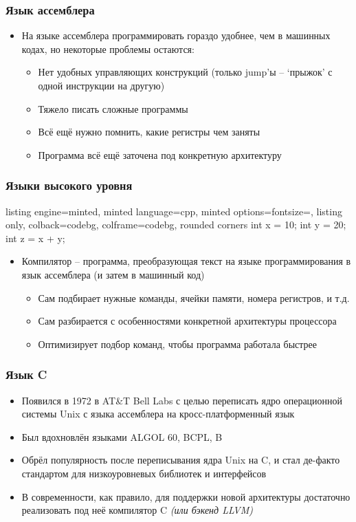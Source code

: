 \documentclass[10pt]{beamer}
\begin{document}
\begin{frame}[fragile]
\frametitle{Язык ассемблера}
\begin{itemize}
\item На языке ассемблера программировать гораздо удобнее, чем в машинных кодах, но некоторые проблемы остаются:
\pause
\begin{itemize}
\item Нет удобных управляющих конструкций (только jump'ы -- `прыжок' с одной инструкции на другую)
\pause
\item Тяжело писать сложные программы
\pause
\item Всё ещё нужно помнить, какие регистры чем заняты
\pause
\item Программа всё ещё заточена под конкретную архитектуру
\end{itemize}
\end{itemize}
\end{frame}

\begin{frame}[fragile]
\frametitle{Языки высокого уровня}
\begin{tcblisting}{listing engine=minted, minted language=cpp, minted options={fontsize=\scriptsize}, listing only, colback=codebg, colframe=codebg, rounded corners}
int x = 10;
int y = 20;
int z = x + y;
\end{tcblisting}
\pause
\begin{itemize}
\item Компилятор -- программа, преобразующая текст на языке программирования в язык ассемблера (и затем в машинный код)
\pause
\begin{itemize}
\item Сам подбирает нужные команды, ячейки памяти, номера регистров, и т.д.
\pause
\item Сам разбирается с особенностями конкретной архитектуры процессора
\pause
\item Оптимизирует подбор команд, чтобы программа работала быстрее
\end{itemize}
\end{itemize}
\end{frame}

\begin{frame}[fragile]
\frametitle{Язык C}
\begin{itemize}
\item Появился в 1972 в AT\&T Bell Labs с целью переписать ядро операционной системы Unix с языка ассемблера на кросс-платформенный язык
\pause
\item Был вдохновлён языками ALGOL 60, BCPL, B
\pause
\item Обрёл популярность после переписывания ядра Unix на C, и стал де-факто стандартом для низкоуровневых библиотек и интерфейсов
\pause
\item В современности, как правило, для поддержки новой архитектуры достаточно реализовать под неё компилятор C \textit{(или бэкенд LLVM)}
\end{itemize}
\end{frame}
\end{document}
